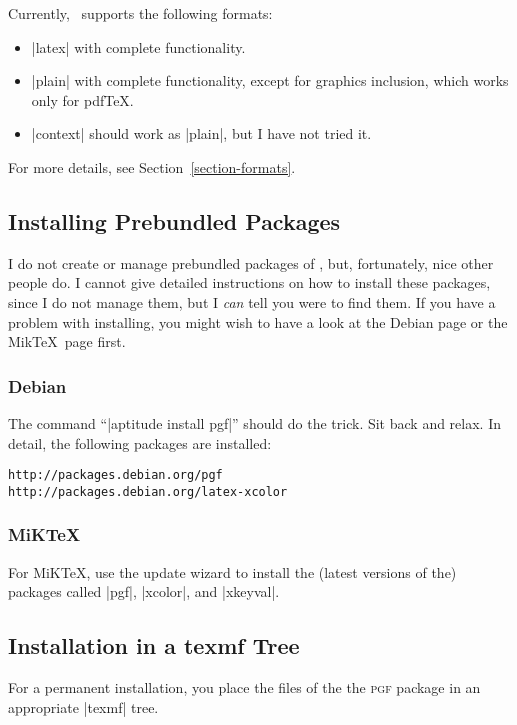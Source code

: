 Currently, \pgfname\ supports the following formats:
\begin{itemize}
\item
  |latex| with complete functionality.
\item
  |plain| with complete functionality, except for graphics inclusion,
  which works only for pdf\TeX.
\item
  |context| should work as |plain|, but I have not tried it.
\end{itemize}

For more details, see Section~\ref{section-formats}.



\subsection{Installing Prebundled Packages}

I do not create or manage prebundled packages of \pgfname, but,
fortunately, nice other people do. I cannot give detailed instructions
on how to install these packages, since I do not manage them, but I
\emph{can} tell you were to find them. If you have a problem with
installing, you might wish to have a look at the Debian page or the
Mik\TeX\ page first.


\subsubsection{Debian}

The command ``|aptitude install pgf|'' should do the trick. Sit back
and relax. In detail, the following packages are installed:  
\begin{verbatim}
http://packages.debian.org/pgf
http://packages.debian.org/latex-xcolor
\end{verbatim}


\subsubsection{MiKTeX}

For MiK\TeX, use the update wizard to install the (latest versions of
the) packages called |pgf|, |xcolor|, and |xkeyval|. 




\subsection{Installation in a texmf Tree}

For a permanent installation, you place the files of the
the \textsc{pgf} package in an appropriate |texmf| tree. 

